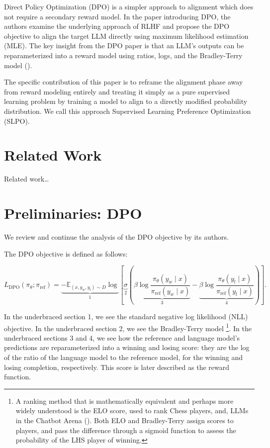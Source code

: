 \documentclass[twoside,11pt]{article}
\begin{document}
Direct Policy Optimization (DPO) is a simpler approach to alignment
which does not require a secondary reward model. In the paper introducing
DPO, the authors examine the underlying
approach of RLHF and propose
the DPO objective to align the target LLM directly using
maximum likelihood estimation (MLE). 
The key insight from the DPO paper is that an LLM's
outputs can be reparameterized into a reward model using ratios, logs,
and the Bradley-Terry model (\cite{bradley1952rank}).

The specific contribution of this paper is to reframe the alignment
phase away from reward modeling entirely and treating it simply as
a pure supervised learning problem by training a model to align to
a directly modified probability distribution. We call this
approach Supervised Learning Preference Optimization (SLPO).

\section{Related Work}

Related work\dots

\section{Preliminaries: DPO}

We review and continue the analysis of the DPO objective by its 
authors.

The DPO objective is defined as follows:

\begin{equation}
  \label{eq:dpo}
  L_\mathrm{DPO}(\pi_\theta; \pi_\mathrm{ref}) =
  \underbrace{
  -\mathbb{E}_{(x, y_w, y_l) \sim D} 
  \log }_{1} 
  \left[ 
    \underbrace{\sigma }_{2}
    \left(
    \underbrace{\beta \log \frac{\pi_\theta(y_w \mid x)}{\pi_\mathrm{ref}(y_w \mid x)}}_{3}
    - \underbrace{\beta \log \frac{\pi_\theta(y_l \mid x)}{\pi_\mathrm{ref}(y_l \mid x)}}_{4} 
    \right)
  \right].
\end{equation}

In the underbraced section 1, we see the standard 
negative log likelihood (NLL) objective.
In the underbraced section 2, we see the Bradley-Terry model 
\footnote{A ranking method that is mathematically equivalent and perhaps more 
widely understood is the ELO score, used to rank Chess players, 
and, LLMs in the Chatbot Arena (\cite{elo1978rating,chiang2024chatbot}). 
Both ELO and Bradley-Terry assign scores to players, and 
pass the difference through a sigmoid function to assess the probability of 
the LHS player of winning. }.
In the underbraced sections 3 and 4, we see how the 
reference and language model's predictions are reparameterized
into a winning and losing score: they are the 
log of the ratio of the language model to the reference model, for the winning and 
losing completion, respectively. 
This score is later described as the reward function.
\end{document}
